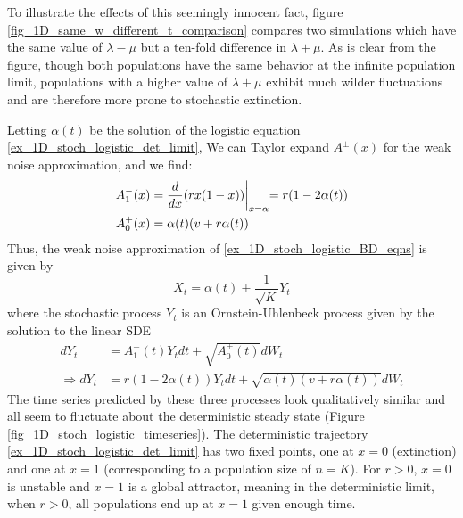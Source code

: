 To illustrate the effects of this seemingly innocent fact, figure \ref{fig_1D_same_w_different_t_comparison} compares two simulations which have the same value of $\lambda - \mu$ but a ten-fold difference in $\lambda+\mu$. As is clear from the figure, though both populations have the same behavior at the infinite population limit, populations with a higher value of $\lambda+\mu$ exhibit much wilder fluctuations and are therefore more prone to stochastic extinction.

Letting $\alpha(t)$ be the solution of the logistic equation \eqref{ex_1D_stoch_logistic_det_limit}, We can Taylor expand $A^{\pm}(x)$ for the weak noise approximation, and we find:
\begin{align*}
	A^-_1(x) &= \frac{d}{dx}(rx(1-x))\biggl{|}_{x=\alpha} = r(1 - 2\alpha(t))\\
	A^+_0(x) &= \alpha(t)(v+r\alpha(t))
\end{align*}
Thus, the weak noise approximation of \ref{ex_1D_stoch_logistic_BD_eqns} is given by
\begin{equation}
	X_t = \alpha(t) + \frac{1}{\sqrt{K}}Y_t
\end{equation}
where the stochastic process $Y_t$ is an Ornstein-Uhlenbeck process given by the solution to the linear SDE
\begin{align}
	dY_t &= A^-_1(t)Y_tdt + \sqrt{A^+_0(t)}dW_t\nonumber\\
	\Rightarrow dY_t &= r(1 - 2\alpha(t))Y_tdt + \sqrt{\alpha(t)(v+r\alpha(t))}dW_t\label{ex_1D_stoch_logistic_WNA}
\end{align}
The time series predicted by these three processes look qualitatively similar and all seem to fluctuate about the deterministic steady state (Figure \ref{fig_1D_stoch_logistic_timeseries}).
The deterministic trajectory \eqref{ex_1D_stoch_logistic_det_limit} has two fixed points, one at $x=0$ (extinction) and one at $x=1$ (corresponding to a population size of $n=K$). For $r > 0$, $x=0$ is unstable and $x=1$ is a global attractor, meaning in the deterministic limit, when $r > 0$, all populations end up at $x=1$ given enough time.
